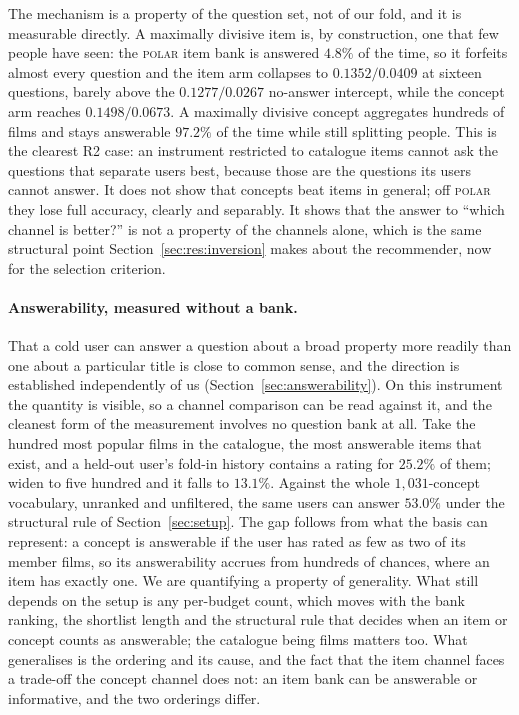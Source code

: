 \documentclass[manuscript,screen,review]{acmart}
\begin{document}
The mechanism is a property of the question set, not of our fold, and it is measurable directly. A maximally divisive item is, by construction, one that few people have seen: the \textsc{polar} item bank is answered $4.8\%$ of the time, so it forfeits almost every question and the item arm collapses to $0.1352/0.0409$ at sixteen questions, barely above the $0.1277/0.0267$ no-answer intercept, while the concept arm reaches $0.1498/0.0673$. A maximally divisive concept aggregates hundreds of films and stays answerable $97.2\%$ of the time while still splitting people. This is the clearest R2 case: an instrument restricted to catalogue items cannot ask the questions that separate users best, because those are the questions its users cannot answer. It does not show that concepts beat items in general; off \textsc{polar} they lose full accuracy, clearly and separably. It shows that the answer to ``which channel is better?'' is not a property of the channels alone, which is the same structural point Section~\ref{sec:res:inversion} makes about the recommender, now for the selection criterion.

\paragraph{Answerability, measured without a bank.} That a cold user can answer a question about a broad property more readily than one about a particular title is close to common sense, and the direction is established independently of us (Section~\ref{sec:answerability}). On this instrument the quantity is visible, so a channel comparison can be read against it, and the cleanest form of the measurement involves no question bank at all. Take the hundred most popular films in the catalogue, the most answerable items that exist, and a held-out user's fold-in history contains a rating for $25.2\%$ of them; widen to five hundred and it falls to $13.1\%$. Against the whole $1{,}031$-concept vocabulary, unranked and unfiltered, the same users can answer $53.0\%$ under the structural rule of Section~\ref{sec:setup}. The gap follows from what the basis can represent: a concept is answerable if the user has rated as few as two of its member films, so its answerability accrues from hundreds of chances, where an item has exactly one. We are quantifying a property of generality. What still depends on the setup is any per-budget count, which moves with the bank ranking, the shortlist length and the structural rule that decides when an item or concept counts as answerable; the catalogue being films matters too. What generalises is the ordering and its cause, and the fact that the item channel faces a trade-off the concept channel does not: an item bank can be answerable or informative, and the two orderings differ.
\end{document}
